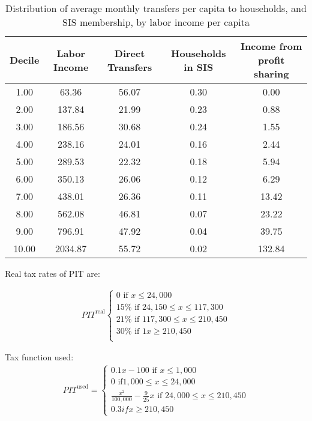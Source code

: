 \documentclass[12pt]{article}
\begin{document}
\begin{table}[H]
\centering
\caption{Distribution of average monthly transfers per capita to households, and SIS membership, by labor income per capita} 
\label{tab:SocPrograms}
\begin{tabular}{ccccc}
  \hline
Decile & Labor Income & Direct Transfers & Households in SIS & Income from profit sharing \\ 
  \hline
1.00 & 63.36 & 56.07 & 0.30 & 0.00 \\ 
  2.00 & 137.84 & 21.99 & 0.23 & 0.88 \\ 
  3.00 & 186.56 & 30.68 & 0.24 & 1.55 \\ 
  4.00 & 238.16 & 24.01 & 0.16 & 2.44 \\ 
  5.00 & 289.53 & 22.32 & 0.18 & 5.94 \\ 
  6.00 & 350.13 & 26.06 & 0.12 & 6.29 \\ 
  7.00 & 438.01 & 26.36 & 0.11 & 13.42 \\ 
  8.00 & 562.08 & 46.81 & 0.07 & 23.22 \\ 
  9.00 & 796.91 & 47.92 & 0.04 & 39.75 \\ 
  10.00 & 2034.87 & 55.72 & 0.02 & 132.84 \\ 
   \hline
\end{tabular}
\end{table}

Real tax rates of PIT are:

\begin{align}
PIT^{\text{real}}
\begin{cases}
	0 \text{ if }x \leq 24,000\\
	15\% \text{ if } 24,150\leq x \leq 117,300\\
	21\% \text{ if } 117,300 \leq x \leq 210,450\\
	30\% \text{ if } 1 x \geq 210,450\\
\end{cases}
\end{align}

Tax function used:
\begin{align}
	PIT^{\text{used}}=
	\begin{cases}
		0.1 x-100 \text{ if }x\leq 1,000 \\
		0 \text{ if} 1,000 \leq x \leq 24,000\\
		\frac{x^2}{100,000}-\frac{9}{25} x \text{ if }24,000\leq x\leq 210,450 \\
		0.3 if x\geq 210,450
	\end{cases}
\end{align}
\end{document}

